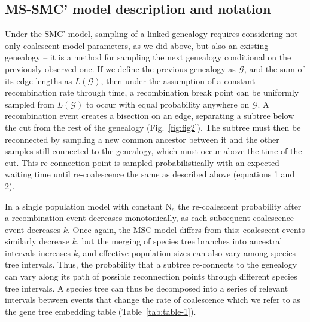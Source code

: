 \documentclass[11pt]{article}
\begin{document}

\subsection{MS-SMC' model description and notation}

Under the SMC' model, sampling of a linked genealogy requires considering not only 
coalescent model parameters, 
as we did above, but also an existing genealogy -- it is a method 
for sampling the next genealogy conditional on the previously observed one. 
If we define the previous genealogy as $\mathcal{G}$, and the sum of its edge lengths 
as $L(\mathcal{G})$, then under the assumption of a constant recombination rate through time,
a recombination break point can be uniformly sampled from $L(\mathcal{G})$ to occur with 
equal probability anywhere on $\mathcal{G}$. A recombination event creates 
a bisection on an edge, separating a subtree below the cut from the rest of 
the genealogy (Fig.~\ref{fig:fig2}). The subtree must then be reconnected by sampling a new common 
ancestor between it and the other samples still connected to the genealogy, which 
must occur above the time of the cut. This re-connection point is sampled 
probabilistically with an expected waiting time until re-coalescence the 
same as described above (equations 1 and 2).

In a single population model with constant N$_e$ the re-coalescent probability
after a recombination event decreases monotonically, as each subsequent 
coalescence event decreases $k$.
Once again, the MSC model 
differs from this: coalescent events similarly decrease $k$, but the merging of 
species tree branches into ancestral intervals increases $k$, and effective population 
sizes can also vary among species tree intervals. 
Thus, the probability that a subtree re-connects to the genealogy can vary 
along its path of possible reconnection points through 
different species tree intervals.
A species tree can thus be decomposed into a series of relevant intervals 
between events that change the rate of coalescence
which we refer to as the gene tree embedding 
table (Table~\ref{tab:table-1}). 
\end{document}
